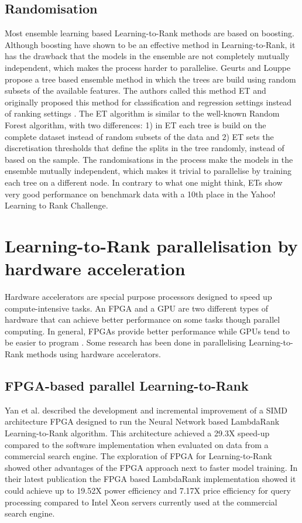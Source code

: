 \subsection{Randomisation}
Most ensemble learning based Learning-to-Rank methods are based on boosting. Although boosting have shown to be an effective method in Learning-to-Rank, it has the drawback that the models in the ensemble are not completely mutually independent, which makes the process harder to parallelise. Geurts and Louppe \cite{Geurts2011} propose a tree based ensemble method in which the trees are build using random subsets of the available features. The authors called this method \ac{ET} and originally proposed this method for classification and regression settings instead of ranking settings \cite{Geurts2006}. The \ac{ET} algorithm is similar to the well-known Random Forest algorithm, with two differences: 1) in \ac{ET} each tree is build on the complete dataset instead of random subsets of the data and 2) \ac{ET} sets the discretisation thresholds that define the splits in the tree randomly, instead of based on the sample. The randomisations in the process make the models in the ensemble mutually independent, which makes it trivial to parallelise by training each tree on a different node. In contrary to what one might think, \ac{ET}s show very good performance on benchmark data with a 10th place in the Yahoo! Learning to Rank Challenge.\\

\section{Learning-to-Rank parallelisation by hardware acceleration}
Hardware accelerators are special purpose processors designed to speed up compute-intensive tasks. An \ac{FPGA} and a \ac{GPU} are two different types of hardware that can achieve better performance on some tasks though parallel computing. In general, \ac{FPGA}s provide better performance while \ac{GPU}s tend to be easier to program \cite{Che2008}. Some research has been done in parallelising Learning-to-Rank methods using hardware accelerators.

\subsection{FPGA-based parallel Learning-to-Rank}
Yan et al. \cite{Yan2009,Yan2010,Yan2011,Yan2012} described the development and incremental improvement of a \ac{SIMD} architecture \ac{FPGA} designed to run the Neural Network based LambdaRank Learning-to-Rank algorithm. This architecture achieved a 29.3X speed-up compared to the software implementation when evaluated on data from a commercial search engine. The exploration of \ac{FPGA} for Learning-to-Rank showed other advantages of the \ac{FPGA} approach next to faster model training. In their latest publication \cite{Yan2012} the \ac{FPGA} based LambdaRank implementation showed it could achieve up to 19.52X power efficiency and 7.17X price efficiency for query processing compared to Intel Xeon servers currently used at the commercial search engine.\\

